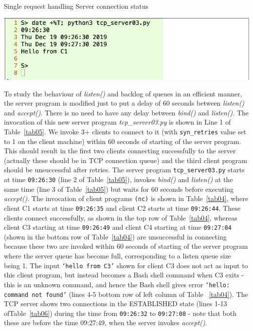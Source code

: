 \begin{table}[H]
\centering

\vspace{-.8cm}

\caption{Single request handling Server connection status}\label{tab05}
\smallskip
\includegraphics[scale=2.35]{src/Figures/chap1/tab05.jpg}
\end{table}

\begin{multicols}{2}
To study the behaviour of \textit{listen()} and backlog of queues in an efficient manner, the server program is modified just to put a delay of 60 seconds between \textit{listen()} and \textit{accept()}. There is no need to have any delay between \textit{bind()} and \textit{listen()}. The invocation of this new server program \textit{tcp\_server03.py} is shown in Line 1 of Table~\ref{tab05}. We invoke 3+ clients to connect to it (with \texttt{syn\_retries} value set to 1 on the client machine) within 60 seconds of starting of the server program. This should result in the first two clients connecting successfully to the server (actually these should be in TCP connection queue) and the third client program should be unsuccessful after retries. The server program \texttt{tcp\_server03.py} \cite{art1-key17} starts at time \texttt{09:26:30} (line 2 of Table~\ref{tab05}), invokes \textit{bind()} and \textit{listen()} at the same time (line 3 of Table~\ref{tab05}) but waits for 60 seconds before executing \textit{accept()}. The invocation of client programs \texttt{(nc)} is shown in Table~\ref{tab04}, where client C1 starts at time \texttt{09:26:35} and client C2 starts at time \texttt{09:26:44}. These clients connect successfully, as shown in the top row of Table~\ref{tab04}, whereas client C3 starting at time \texttt{09:26:49} and client C4 starting at time \texttt{09:27:04} (shown in the bottom row of Table~\ref{tab04}) are unsuccessful in connecting because these two are invoked within 60 seconds of starting of the server program where the server queue has become full, corresponding to a listen queue size being 1. The input \texttt{‘hello from C3’} shown for client C3 does not act as input to this client program, but instead becomes a Bash shell command when C3 exits - this is an unknown command, and hence the Bash shell gives error \texttt{‘hello: command not found’} (lines 4-5 bottom row of left column of Table ~\ref{tab04}). The TCP server shows two connections in the ESTABLISHED state (lines 1-13 of\break Table~\ref{tab06}) during the time from \texttt{09:26:32} to \texttt{09:27:08} - note that both these are before the time 09:27:49, when the server invokes \textit{accept()}.
\end{multicols}

